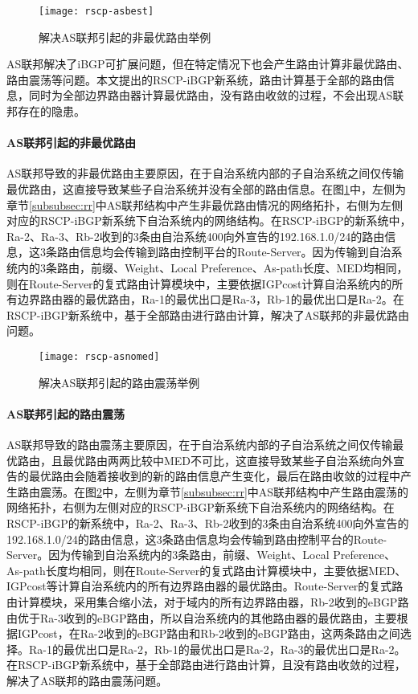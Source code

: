 \begin{figure}
  \centering
  \texttt{[image: rscp-asbest]}
  \caption{解决AS联邦引起的非最优路由举例}
  \label{fig:rscp-asbest}
\end{figure}

AS联邦解决了iBGP可扩展问题，但在特定情况下也会产生路由计算非最优路由、路由震荡等问题。本文提出的RSCP-iBGP新系统，路由计算基于全部的路由信息，同时为全部边界路由器计算最优路由，没有路由收敛的过程，不会出现AS联邦存在的隐患。\\

\paragraph{AS联邦引起的非最优路由}
AS联邦导致的非最优路由主要原因，在于自治系统内部的子自治系统之间仅传输最优路由，这直接导致某些子自治系统并没有全部的路由信息。在图\ref{fig:rscp-asbest}中，左侧为章节\ref{subsubsec:rr}中AS联邦结构中产生非最优路由情况的网络拓扑，右侧为左侧对应的RSCP-iBGP新系统下自治系统内的网络结构。在RSCP-iBGP的新系统中，Ra-2、Ra-3、Rb-2收到的3条由自治系统400向外宣告的192.168.1.0/24的路由信息，这3条路由信息均会传输到路由控制平台的Route-Server。因为传输到自治系统内的3条路由，前缀、Weight、Local Preference、As-path长度、MED均相同，则在Route-Server的复式路由计算模块中，主要依据IGPcost计算自治系统内的所有边界路由器的最优路由，Ra-1的最优出口是Ra-3，Rb-1的最优出口是Ra-2。在RSCP-iBGP新系统中，基于全部路由进行路由计算，解决了AS联邦的非最优路由问题。\\




\begin{figure}
  \centering
  \texttt{[image: rscp-asnomed]}
  \caption{解决AS联邦引起的路由震荡举例}
  \label{fig:rscp-asnomed}
\end{figure}

\paragraph{AS联邦引起的路由震荡}

AS联邦导致的路由震荡主要原因，在于自治系统内部的子自治系统之间仅传输最优路由，且最优路由两两比较中MED不可比，这直接导致某些子自治系统向外宣告的最优路由会随着接收到的新的路由信息产生变化，最后在路由收敛的过程中产生路由震荡。在图\ref{fig:rscp-asnomed}中，左侧为章节\ref{subsubsec:rr}中AS联邦结构中产生路由震荡的网络拓扑，右侧为左侧对应的RSCP-iBGP新系统下自治系统内的网络结构。在RSCP-iBGP的新系统中，Ra-2、Ra-3、Rb-2收到的3条由自治系统400向外宣告的192.168.1.0/24的路由信息，这3条路由信息均会传输到路由控制平台的Route-Server。因为传输到自治系统内的3条路由，前缀、Weight、Local Preference、As-path长度均相同，则在Route-Server的复式路由计算模块中，主要依据MED、IGPcost等计算自治系统内的所有边界路由器的最优路由。Route-Server的复式路由计算模块，采用集合缩小法，对于域内的所有边界路由器，Rb-2收到的eBGP路由优于Ra-3收到的eBGP路由，所以自治系统内的其他路由器的最优路由，主要根据IGPcost，在Ra-2收到的eBGP路由和Rb-2收到的eBGP路由，这两条路由之间选择。Ra-1的最优出口是Ra-2，Rb-1的最优出口是Ra-2，Ra-3的最优出口是Ra-2。在RSCP-iBGP新系统中，基于全部路由进行路由计算，且没有路由收敛的过程，解决了AS联邦的路由震荡问题。


